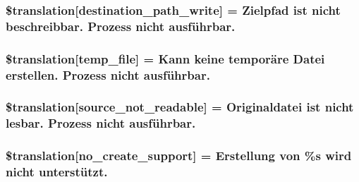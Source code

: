 \subsubsection[{\$translation}]{\setlength{\rightskip}{0pt plus 5cm}\$translation\mbox{[}\textquotesingle{}destination\+\_\+path\+\_\+write\textquotesingle{}\mbox{]} = \textquotesingle{}Zielpfad ist nicht beschreibbar. Prozess nicht ausführbar.\textquotesingle{}}\label{class_8upload_8de___d_e_8php_a40e4e1962226b89fd76da5819a9602b0}
\hypertarget{class_8upload_8de___d_e_8php_a2baece8da11e20d45175db91851ec3e3}{}
\subsubsection[{\$translation}]{\setlength{\rightskip}{0pt plus 5cm}\$translation\mbox{[}\textquotesingle{}temp\+\_\+file\textquotesingle{}\mbox{]} = \textquotesingle{}Kann keine temporäre Datei erstellen. Prozess nicht ausführbar.\textquotesingle{}}\label{class_8upload_8de___d_e_8php_a2baece8da11e20d45175db91851ec3e3}
\hypertarget{class_8upload_8de___d_e_8php_a922967ca2df0efdd455261142d8e5715}{}
\subsubsection[{\$translation}]{\setlength{\rightskip}{0pt plus 5cm}\$translation\mbox{[}\textquotesingle{}source\+\_\+not\+\_\+readable\textquotesingle{}\mbox{]} = \textquotesingle{}Originaldatei ist nicht lesbar. Prozess nicht ausführbar.\textquotesingle{}}\label{class_8upload_8de___d_e_8php_a922967ca2df0efdd455261142d8e5715}
\hypertarget{class_8upload_8de___d_e_8php_a346dfd1ade29f583dd20d345c436859f}{}
\subsubsection[{\$translation}]{\setlength{\rightskip}{0pt plus 5cm}\$translation\mbox{[}\textquotesingle{}no\+\_\+create\+\_\+support\textquotesingle{}\mbox{]} = \textquotesingle{}Erstellung von \%s wird nicht unterstützt.\textquotesingle{}}\label{class_8upload_8de___d_e_8php_a346dfd1ade29f583dd20d345c436859f}
\hypertarget{class_8upload_8de___d_e_8php_a53013ce9255c4e1849098ddd9fdb2b3f}{}
